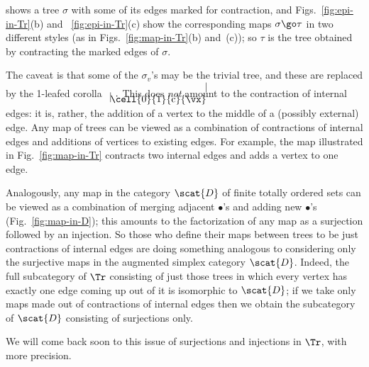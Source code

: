 %
shows a tree $\sigma$ with some of its edges marked for contraction, and
Figs.~\ref{fig:epi-in-Tr}(b) and ~\ref{fig:epi-in-Tr}(c) show the
corresponding maps $\sigma \go \tau$ in two different styles (as in
Figs.~\ref{fig:map-in-Tr}(b) and~(c)); so $\tau$ is the tree obtained by
contracting the marked edges of $\sigma$.  

The caveat is that some of the $\sigma_v$'s may be the trivial tree, and
these are replaced by the 1-leafed corolla 
$
\setlength{\unitlength}{1em}
\begin{array}{c}
\begin{picture}(0,2)(0,0)
\put(0,0){\line(0,1){1}}
\cell{0}{1}{c}{\vx}
\put(0,1){\line(0,1){1}}
\end{picture}
\end{array}.
$
This does \emph{not} amount to the contraction of internal edges: it is,
rather, the addition%
%
%
%
of a vertex to the middle of a (possibly external)
edge.  Any map of trees can be viewed as a combination of contractions of
internal edges and additions of vertices to existing edges.  For example,
the map illustrated in Fig.~\ref{fig:map-in-Tr} contracts two internal
edges and adds a vertex to one edge.

Analogously, any map in the category $\scat{D}$ of finite totally ordered
sets can be viewed as a combination of merging adjacent $\bullet$'s and
adding new $\bullet$'s (Fig.~\ref{fig:map-in-D}); this amounts to the
factorization%
%
%
of any map as a surjection followed by an injection.  So
those who define their maps between trees to be just contractions of
internal edges are doing something analogous to considering only the
surjective maps in the augmented simplex category $\scat{D}$.  Indeed, the
full subcategory of $\Tr$ consisting of just those trees in which every
vertex has exactly one edge coming up out of it is isomorphic to
$\scat{D}$; if we take only maps made out of contractions of internal edges
then we obtain the subcategory of $\scat{D}$ consisting of surjections
only.

We will come back soon to this issue of surjections and injections in
$\Tr$, with more precision.

\paragraph*{}

